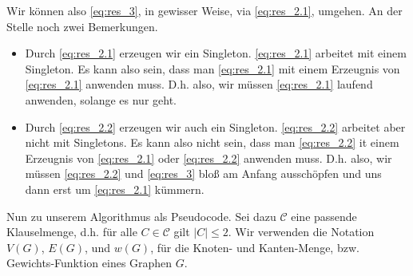 \begin{solution}
\begin{enumerate}[label = \arabic*., start = 0]
\end{enumerate}

Wir können also \eqref{eq:res_3}, in gewisser Weise, via \eqref{eq:res_2.1}, umgehen.
An der Stelle noch zwei Bemerkungen.

\begin{itemize}

    \item Durch \eqref{eq:res_2.1} erzeugen wir ein Singleton.
    \eqref{eq:res_2.1} arbeitet mit einem Singleton.
    Es kann also sein, dass man \eqref{eq:res_2.1} mit einem Erzeugnis von \eqref{eq:res_2.1} anwenden muss.
    D.h. also, wir müssen \eqref{eq:res_2.1} laufend anwenden, solange es nur geht.

    \item Durch \eqref{eq:res_2.2} erzeugen wir auch ein Singleton.
    \eqref{eq:res_2.2} arbeitet aber nicht mit Singletons.
    Es kann also nicht sein, dass man \eqref{eq:res_2.2} it einem Erzeugnis von \eqref{eq:res_2.1} oder \eqref{eq:res_2.2} anwenden muss.
    D.h. also, wir müssen \eqref{eq:res_2.2} und \eqref{eq:res_3} bloß am Anfang ausschöpfen und uns dann erst um \eqref{eq:res_2.1} kümmern.

\end{itemize}

Nun zu unserem Algorithmus als Pseudocode.
Sei dazu $\mathcal C$ eine passende Klauselmenge, d.h. für alle $C \in \mathcal C$ gilt $|C| \leq 2$.
Wir verwenden die Notation $V(G)$, $E(G)$, und $w(G)$, für die Knoten- und Kanten-Menge, bzw. Gewichts-Funktion eines Graphen $G$.


\end{solution}
